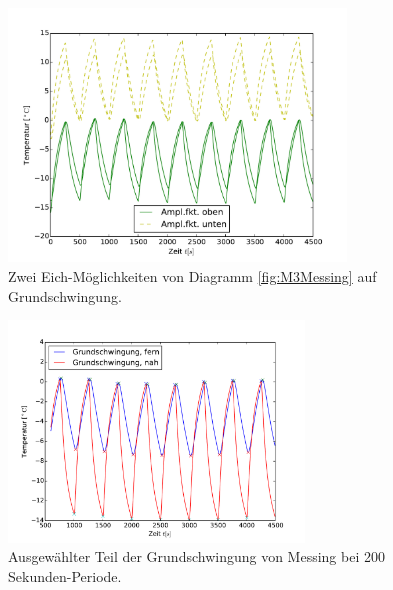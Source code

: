 \begin{figure}[h!]
	\centering
	\includegraphics[width=0.8\textwidth]{Bilder/Normierungsauswahl/M3_Alu_norm.pdf}
	\caption{ Zwei Eich-Möglichkeiten von Diagramm \ref{fig:M3Messing} auf Grundschwingung.}
	\label{fig:M3MessingNorm}
\end{figure}
\begin{figure}[h!]
	\centering
	\includegraphics[width=0.7\textwidth]{Bilder/M3_Messing_norm.pdf}
	\caption{Ausgewählter Teil der Grundschwingung von Messing bei 200 Sekunden-Periode.}
	\label{fig:M3MessingNormkurve}
\end{figure}
